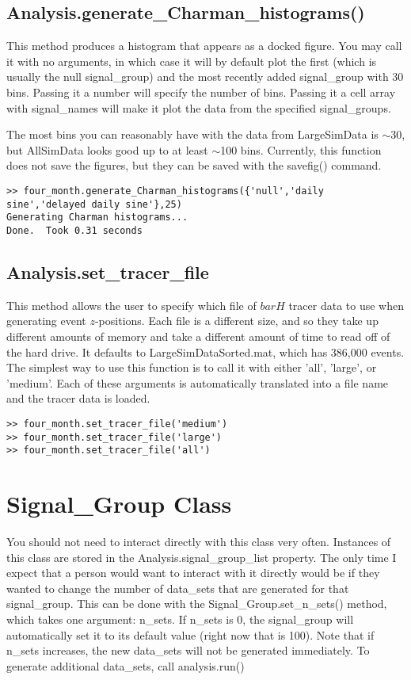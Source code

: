 \documentclass[12pt]{report}
\begin{document}
\section{Analysis.generate\_Charman\_histograms()}
This method produces a histogram that appears as a docked figure.  You may call it with no arguments, in which case it will by default plot the first (which is usually the null signal\_group) and the most recently added signal\_group with 30 bins.  Passing it a number will specify the number of bins.  Passing it a cell array with signal\_names will make it plot the data from the specified signal\_groups.

The most bins you can reasonably have with the data from LargeSimData is ${\sim}$30, but AllSimData looks good up to at least ${\sim}$100 bins.  Currently, this function does not save the figures, but they can be saved with the savefig() command.

\begin{verbatim}
>> four_month.generate_Charman_histograms({'null','daily sine','delayed daily sine'},25)
Generating Charman histograms...
Done.  Took 0.31 seconds
\end{verbatim}

\section{Analysis.set\_tracer\_file}
This method allows the user to specify which file of $bar{H}$ tracer data to use when generating event $z$-positions.  Each file is a different size, and so they take up different amounts of memory and take a different amount of time to read off of the hard drive.  It defaults to LargeSimDataSorted.mat, which has 386,000 events.  The simplest way to use this function is to call it with either 'all', 'large', or 'medium'.  Each of these arguments is automatically translated into a file name and the tracer data is loaded.

\begin{verbatim}
>> four_month.set_tracer_file('medium')
>> four_month.set_tracer_file('large')
>> four_month.set_tracer_file('all')
\end{verbatim}





\chapter{Signal\_Group Class}
You should not need to interact directly with this class very often.  Instances of this class are stored in the Analysis.signal\_group\_list property.  The only time I expect that a person would want to interact with it directly would be if they wanted to change the number of data\_sets that are generated for that signal\_group.  This can be done with the Signal\_Group.set\_n\_sets() method, which takes one argument: n\_sets.  If n\_sets is 0, the signal\_group will automatically set it to its default value (right now that is 100).  Note that if n\_sets increases, the new data\_sets will not be generated immediately.  To generate additional data\_sets, call analysis.run()
\end{document}
